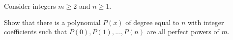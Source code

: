 Consider integers $m\ge 2$ and $n\ge 1$.

Show that there is a polynomial $P(x)$ of degree equal to $n$ with integer coefficients such that $P(0),P(1),...,P(n)$ are all perfect powers of $m$.